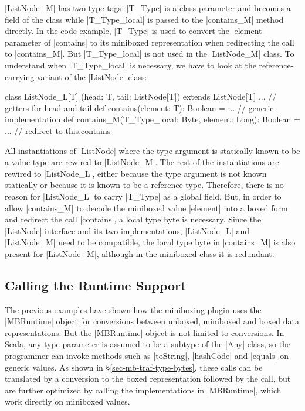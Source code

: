 |ListNode_M| has two type tags: |T_Type| is a class parameter and becomes a field of the class while |T_Type_local| is passed to the |contains_M| method directly. In the code example, |T_Type| is used to convert the |element| parameter of |contains| to its miniboxed representation when redirecting the call to |contains_M|. But |T_Type_local| is not used in the |ListNode_M| class. To understand when |T_Type_local| is necessary, we have to look at the re\-fe\-rence-carrying variant of the |ListNode| class:

\begin{lstlisting-nobreak}
 class ListNode_L[T]
   (head: T, tail: ListNode[T]) extends ListNode[T] {
   ... // getters for head and tail
   def contains(element: T): Boolean =
         ... // generic implementation
   def contains_M(T_Type_local: Byte, element: Long): Boolean =
         ... // redirect to this.contains
 }
\end{lstlisting-nobreak}

All instantiations of |ListNode| where the type argument is statically known to be a value type are rewired to |ListNode_M|. The rest of the instantiations are rewired to |ListNode_L|, either because the type argument is not known statically or because it is known to be a reference type. Therefore, there is no reason for |ListNode_L| to carry |T_Type| as a global field. But, in order to allow |contains_M| to decode the miniboxed value |element| into a boxed form and redirect the call |contains|, a local type byte is necessary. Since the |ListNode| interface and its two implementations, |ListNode_L| and |ListNode_M| need to be compatible, the local type byte in |contains_M| is also present for |ListNode_M|, although in the miniboxed class it is redundant.

\subsection{Calling the Runtime Support}
\label{sec-mb-traf-runtime}

The previous examples have shown how the miniboxing plugin uses the |MBRuntime| object for conversions between unboxed, miniboxed and boxed data representations. But the |MBRuntime| object is not limited to conversions. In Scala, any type parameter is assumed to be a subtype of the |Any| class, so the programmer can invoke methods such as |toString|, |hashCode| and |equals| on generic values. As shown in \S\ref{sec-mb-traf-type-bytes}, these calls can be translated by a conversion to the boxed representation followed by the call, but are further optimized by calling the implementations in |MBRuntime|, which work directly on miniboxed values.

